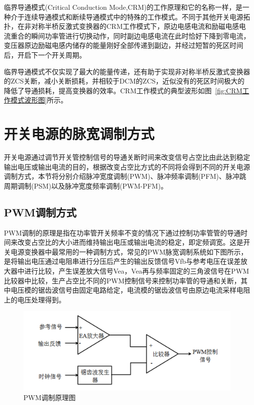 临界导通模式(Critical Conduction Mode,CRM)的工作原理和它的名称一样，是一种介于连续导通模式和断续导通模式中的特殊的工作模式。不同于其他开关电源拓扑，在非对称半桥反激式变换器的CRM工作模式下，原边电感电流和励磁电感电流重合的瞬间功率管进行切换动作，同时副边电感电流在此时恰好下降到零电流，变压器原边励磁电感内储存的能量刚好全部传递到副边，并经过短暂的死区时间后，开启下一个开关周期。

临界导通模式不仅实现了最大的能量传递，还有助于实现非对称半桥反激式变换器的ZCS关断，减小关断损耗，并相较于DCM的ZCS，近似没有的死区时间极大的降低了导通损耗，提高变换器的效率。CRM工作模式的典型波形如图~\ref{fig:CRM工作模式波形图}所示。








\section{开关电源的脉宽调制方式}
开关电源通过调节开关管控制信号的导通关断时间来改变信号占空比由此达到稳定输出电压或输出电流的目的，根据改变占空比方式的不同将会得到不同的开关电源调制方式，本节将分别介绍脉冲宽度调制(PWM)、脉冲频率调制(PFM)、脉冲跳周期调制(PSM)以及脉冲宽度频率调制(PWM-PFM)。

\subsection{PWM调制方式}
PWM调制的原理是指在功率管开关频率不变的情况下通过控制功率管管的导通时间来改变占空比的大小进而维持输出电压或输出电流的稳定，即定频调宽。这是开关电源变换器中最常用的一种调制方式，常见的PWM脉宽调制系统如下图所示，是将输出电压通过电阻串进行分压后产生的输出反馈信号Vfb与参考电压在误差放大器中进行比较，产生误差放大信号Vea，Vea再与频率固定的三角波信号在PWM比较器中比较，生产占空比不同的PWM控制信号来控制功率管的导通和关断，其中电压模的锯齿波信号由固定电路给定，电流模的锯齿波信号由原边电流采样电阻上的电压处理得到。

\begin{figure}[htbp] 
    \centering
    \includegraphics[width=0.8\linewidth]{figures/PWM调制1.png}
    \caption{PWM调制原理图}
    \label{fig:PWM调制1}
\end{figure}

